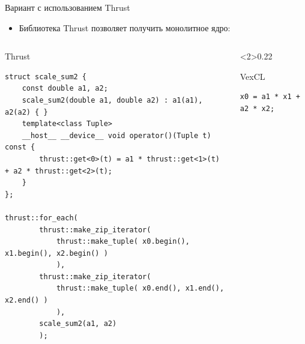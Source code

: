 \documentclass[@BEAMER_OPTIONS@]{beamer}
\begin{document}
\begin{frame}[fragile]{Вариант с использованием Thrust}
    \begin{itemize}
        \item Библиотека Thrust позволяет получить монолитное ядро:
    \end{itemize}
    \begin{columns}
        \begin{column}{0.70\textwidth}
            \begin{exampleblock}{Thrust}
                \begin{adjustbox}{width=0.95\textwidth,height=0.6\textheight,keepaspectratio}
                    \begin{lstlisting}
struct scale_sum2 {
    const double a1, a2;
    scale_sum2(double a1, double a2) : a1(a1), a2(a2) { }
    template<class Tuple>
    __host__ __device__ void operator()(Tuple t) const {
        thrust::get<0>(t) = a1 * thrust::get<1>(t) + a2 * thrust::get<2>(t);
    }
};

thrust::for_each(
        thrust::make_zip_iterator(
            thrust::make_tuple( x0.begin(), x1.begin(), x2.begin() )
            ),
        thrust::make_zip_iterator(
            thrust::make_tuple( x0.end(), x1.end(), x2.end() )
            ),
        scale_sum2(a1, a2)
        );
                    \end{lstlisting}
                \end{adjustbox}
            \end{exampleblock}
        \end{column}
        \begin{column}<2>{0.22\textwidth}
            \begin{exampleblock}{VexCL}
                \begin{adjustbox}{width=0.95\textwidth,height=0.6\textheight,keepaspectratio}
                    \begin{lstlisting}
x0 = a1 * x1 + a2 * x2;
                    \end{lstlisting}
                \end{adjustbox}
            \end{exampleblock}
        \end{column}
    \end{columns}
\end{frame}

\note{ }
\end{document}
